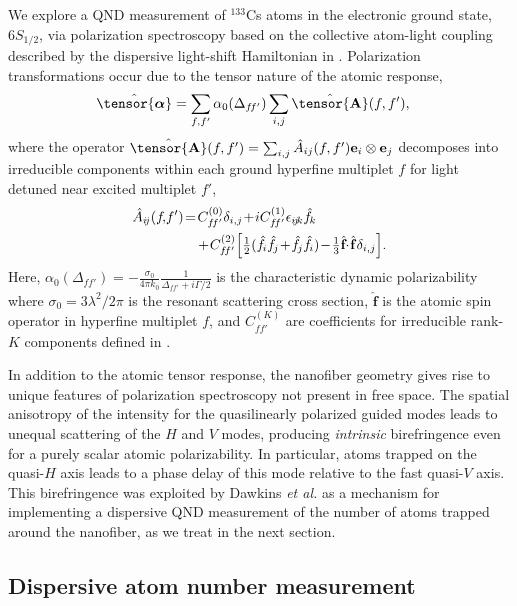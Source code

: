 \documentclass[aps,pra,twocolumn]{revtex4-1} %
\newcommand{\poltens}{\hat{\tensor{\boldsymbol{\alpha}}}}
\newcommand{\charpol}{\alpha_0(\Delta_{f\!f'})}
\begin{document}
We explore a QND measurement of ${}^{133}$Cs atoms in the electronic ground state, $6S_{1/2}$, via polarization spectroscopy based on the collective atom-light coupling described by the dispersive light-shift Hamiltonian in . Polarization transformations occur due to the tensor nature of the atomic response,
	\begin{align} \label{Eq::Polarizability}
		\poltens &=  \sum_{f,f'} \charpol \sum_{i,j} \hat{\tensor{\mbf{A}}}(f,f'),
	\end{align}
where the operator $\hat{\tensor{\mbf{A}}}(f,f') = \sum_{i,j} \hat{A}_{ij}(f,f')\mathbf{e}_i \otimes \mathbf{e}_j$ decomposes into irreducible components within each ground hyperfine multiplet $f$ for light detuned near excited multiplet $f'$,  
	\begin{align} \label{Eq::PolarizabilityIrrep}
		\hat{A}_{i\!j}(f\!,\!f')&\!=\!  C_{f\!f'}^{(0)} \delta_{i,j}\!+\! iC_{f\!f'}^{(1)}\epsilon_{i\!j\!k}\hat{f}\!_k \nn\\
		&\quad\!+\! C_{f\!f'}^{(2)} \Big[ \smallfrac{1}{2} ( \hat{f}\!_i\hat{f}\!_j \!+\!\hat{f}\!_j\hat{f}\!_i )\!-\!\smallfrac{1}{3} \hat{\mathbf{f}}\!\!\cdot\!\hat{\mathbf{f}} \delta_{i,j} \Big]. 
\end{align}
Here, $\charpol = -\frac{\sigma_0}{4\pi k_0}\frac{1 }{\Delta_{ff'}+i\Gamma/2}$ is the characteristic dynamic polarizability where $\sigma_0 = 3 \lambda^2/2\pi$ is the resonant scattering cross section, $\hat{\mathbf{f}}$ is the atomic  spin operator in hyperfine multiplet $f$, and $C_{ff'}^{(K)}$ are coefficients for irreducible rank-$K$ components defined in \cite{deutsch_quantum_2010}. 

In addition to the atomic tensor response, the nanofiber geometry gives rise to unique features of polarization spectroscopy not present in free space.  The spatial anisotropy of the intensity for the quasilinearly polarized guided modes leads to unequal scattering of the $H$ and $V$ modes, producing \emph{intrinsic} birefringence even for a purely scalar atomic polarizability.  
In particular, atoms trapped on the quasi-$H$ axis leads to a phase delay of this mode relative to the fast quasi-$V$ axis. 
This birefringence was exploited by Dawkins {\em et al.} \cite{dawkins_dispersive_2011} as a mechanism for implementing a dispersive QND measurement of the number of atoms trapped around the nanofiber, as we treat in the next section. 


	\subsection{Dispersive atom number measurement} \label{Sec::AtomNumberMeasurement}
\end{document}
